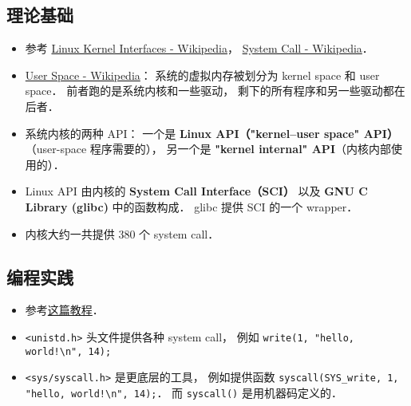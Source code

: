 
\begin{issues}
\issueDraft
\end{issues}

\subsection{理论基础}
\begin{itemize}
\item 参考 \href{https://en.wikipedia.org/wiki/Linux_kernel_interfaces}{Linux Kernel Interfaces - Wikipedia}， \href{https://en.wikipedia.org/wiki/System_call}{System Call - Wikipedia}．
\item \href{https://en.wikipedia.org/wiki/User_space_and_kernel_space}{User Space - Wikipedia}： 系统的虚拟内存被划分为 kernel space 和 user space． 前者跑的是系统内核和一些驱动， 剩下的所有程序和另一些驱动都在后者．
\item 系统内核的两种 API： 一个是 \textbf{Linux API（"kernel–user space" API）}（user-space 程序需要的）， 另一个是 \textbf{"kernel internal" API}（内核内部使用的）．
\item Linux API 由内核的 \textbf{System Call Interface（SCI）} 以及 \textbf{GNU C Library (glibc)} 中的函数构成． glibc 提供 SCI 的一个 wrapper．
\item 内核大约一共提供 380 个 system call．
\end{itemize}

\subsection{编程实践}
\begin{itemize}
\item 参考\href{https://jameshfisher.com/2018/02/19/how-to-syscall-in-c/}{这篇教程}．
\item \verb|<unistd.h>| 头文件提供各种 system call， 例如 \verb|write(1, "hello, world!\n", 14);|
\item \verb|<sys/syscall.h>| 是更底层的工具， 例如提供函数 \verb|syscall(SYS_write, 1, "hello, world!\n", 14);|． 而 \verb|syscall()| 是用机器码定义的．
\end{itemize}

